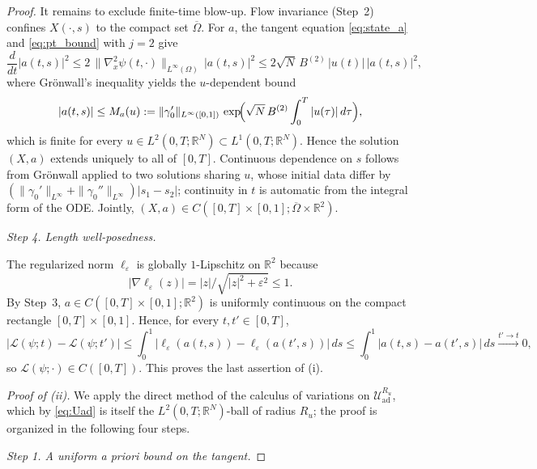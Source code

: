 \documentclass[12pt, reqno]{amsart}
\theoremstyle{plain}
\theoremstyle{definition}
\numberwithin{equation}{section}
\numberwithin{figure}{section}
\numberwithin{algorithm}{section}
\begin{document}
\begin{proof}
It remains to exclude finite-time blow-up. Flow invariance (Step~2) confines $X(\cdot,s)$ to the compact set $\overline\Omega$. For $a$, the tangent equation \eqref{eq:state_a} and \eqref{eq:pt_bound} with $j=2$ give
\begin{equation*}
\frac{d}{dt}|a(t,s)|^2\le 2\,\|\nabla_x^2\psi(t,\cdot)\|_{L^\infty(\Omega)}\,|a(t,s)|^2\le 2\sqrt N\,B^{(2)}\,|u(t)|\,|a(t,s)|^2,
\end{equation*}
where Gr\"onwall's inequality yields the $u$-dependent bound
\begin{equation}\label{eq:Ma_u}
|a(t,s)|\le M_a(u):=\|\gamma_0'\|_{L^\infty([0,1])}\,\exp\!\Bigl(\sqrt N\,B^{(2)}\int_0^T|u(\tau)|\,d\tau\Bigr),
\end{equation}
which is finite for every $u\in L^2(0,T;\mathbb R^N)\subset L^1(0,T;\mathbb R^N)$. Hence the solution $(X,a)$ extends uniquely to all of $[0,T]$. Continuous dependence on $s$ follows from Gr\"onwall applied to two solutions sharing $u$, whose initial data differ by $(\|\gamma_0'\|_{L^\infty}+\|\gamma_0''\|_{L^\infty})|s_1-s_2|$; continuity in $t$ is automatic from the integral form of the ODE. Jointly, $(X,a)\in C([0,T]\times[0,1];\overline\Omega\times\mathbb R^2)$.

\vskip 5pt
\noindent\textit{Step 4. Length well-posedness.}

The regularized norm $\ell_\varepsilon$ is globally $1$-Lipschitz on $\mathbb R^2$ because $$|\nabla\ell_\varepsilon(z)|=|z|/\sqrt{|z|^2+\varepsilon^2}\le 1.$$ By Step~3, $a\in C([0,T]\times[0,1];\mathbb R^2)$ is uniformly continuous on the compact rectangle $[0,T]\times[0,1]$. Hence, for every $t,t'\in[0,T]$,
\begin{equation*}
|\mathcal L(\psi;t)-\mathcal L(\psi;t')|\le\int_0^1|\ell_\varepsilon(a(t,s))-\ell_\varepsilon(a(t',s))|\,ds\le\int_0^1|a(t,s)-a(t',s)|\,ds\xrightarrow{t'\to t}0,
\end{equation*}
so $\mathcal L(\psi;\cdot)\in C([0,T])$. This proves the last assertion of (i).

\vskip 5pt
\noindent\textit{Proof of \textup{(ii)}.}
We apply the direct method of the calculus of variations on $\mathcal U_{\mathrm{ad}}^{R_u}$, which by \eqref{eq:Uad} is itself the $L^2(0,T;\mathbb R^N)$-ball of radius $R_u$; the proof is organized in the following four steps.

\vskip 5pt
\noindent\textit{Step 1. A uniform \emph{a priori} bound on the tangent.}


\end{proof}
\end{document}

